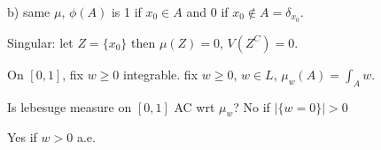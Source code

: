 b) same $\mu$, $\phi(A)$ is 1 if $x_0 \in A$ and $0$ if $x_0 \notin A= \delta_{x_0}$. 

Singular: let $Z= \{x_0\}$ then $\mu(Z)=0$, $V(Z^C)=0$. 


On $[0,1]$, fix $w \geq 0$ integrable. 
fix $w \geq 0$, $w \in L$, $\mu_w(A) = \int_A w$.

Is lebesuge measure on $[0,1]$ AC wrt $\mu_w$? No if $|\{w=0\}|>0$ 

Yes if $w>0$ a.e.
































